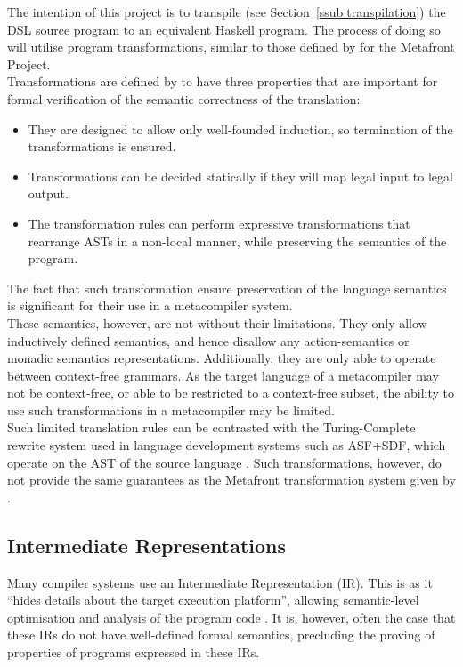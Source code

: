 \documentclass[a4paper,11pt]{report}
\begin{document}
The intention of this project is to transpile (see Section~\ref{ssub:transpilation}) the DSL source program to an equivalent Haskell program.
The process of doing so will utilise program transformations, similar to those defined by \citet{brabrand2003metafront} for the Metafront Project.\\

Transformations are defined by \citet{brabrand2003metafront} to have three properties that are important for formal verification of the semantic correctness of the translation:
\begin{itemize}
    \item They are designed to allow only well-founded induction, so termination of the transformations is ensured.
    \item Transformations can be decided statically if they will map legal input to legal output. 
    \item The transformation rules can perform expressive transformations that rearrange ASTs in a non-local manner, while preserving the semantics of the program.
\end{itemize}

The fact that such transformation ensure preservation of the language semantics is significant for their use in a metacompiler system. \\

These semantics, however, are not without their limitations. 
They only allow inductively defined semantics, and hence disallow any action-semantics or monadic semantics representations. 
Additionally, they are only able to operate between context-free grammars. 
As the target language of a metacompiler may not be context-free, or able to be restricted to a context-free subset, the ability to use such transformations in a metacompiler may be limited.\\

Such limited translation rules can be contrasted with the Turing-Complete rewrite system used in language development systems such as ASF+SDF, which operate on the AST of the source language \citep{van2001asf+}.
Such transformations, however, do not provide the same guarantees as the Metafront transformation system given by \citep{brabrand2003metafront}.


\subsection{Intermediate Representations} %
\label{sub:intermediate_representations}
Many compiler systems use an Intermediate Representation (IR).
This is as it ``hides details about the target execution platform'', allowing semantic-level optimisation and analysis of the program code \citep{Zhao:2012:FLI:2103621.2103709}.
It is, however, often the case that these IRs do not have well-defined formal semantics, precluding the proving of properties of programs expressed in these IRs. \\
\end{document}
